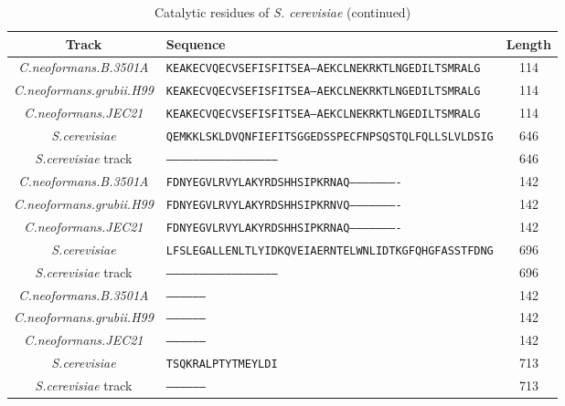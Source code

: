 \begin{table}[htp]\footnotesize
\begin{tabular}{|c|l|c|} \hline
\textbf{Track} & \textbf{Sequence} & \textbf{Length}\\ \hline
\textit{C.neoformans.B.3501A} & \texttt{KEAKECVQECVSEFISFITSEA---AEKCLNEKRKTLNGEDILTSMRALG} & 114
\\
\textit{C.neoformans.grubii.H99} & \texttt{KEAKECVQECVSEFISFITSEA---AEKCLNEKRKTLNGEDILTSMRALG} & 114
\\
\textit{C.neoformans.JEC21} & \texttt{KEAKECVQECVSEFISFITSEA---AEKCLNEKRKTLNGEDILTSMRALG} & 114
\\
\textit{S.cerevisiae} & \texttt{QEMKKLSKLDVQNFIEFITSGGEDSSPECFNPSQSTQLFQLLSLVLDSIG} & 646
\\
\textit{S.cerevisiae} track & \texttt{--------------------------------------------------} & 646
\\
\hline
\textit{C.neoformans.B.3501A} & \texttt{FDNYEGVLRVYLAKYRDSHHSIPKRNAQ----------------------} & 142
\\
\textit{C.neoformans.grubii.H99} & \texttt{FDNYEGVLRVYLAKYRDSHHSIPKRNVQ----------------------} & 142
\\
\textit{C.neoformans.JEC21} & \texttt{FDNYEGVLRVYLAKYRDSHHSIPKRNAQ----------------------} & 142
\\
\textit{S.cerevisiae} & \texttt{LFSLEGALLENLTLYIDKQVEIAERNTELWNLIDTKGFQHGFASSTFDNG} & 696
\\
\textit{S.cerevisiae} track & \texttt{--------------------------------------------------} & 696
\\
\hline
\textit{C.neoformans.B.3501A} & \texttt{-----------------} & 142
\\
\textit{C.neoformans.grubii.H99} & \texttt{-----------------} & 142
\\
\textit{C.neoformans.JEC21} & \texttt{-----------------} & 142
\\
\textit{S.cerevisiae} & \texttt{TSQKRALPTYTMEYLDI} & 713
\\
\textit{S.cerevisiae} track & \texttt{-----------------} & 713
\\
\hline
\end{tabular}
\caption{Catalytic residues of \textit{S. cerevisiae} (continued)}
\label{tab:active3}
\end{table} \FloatBarrier
